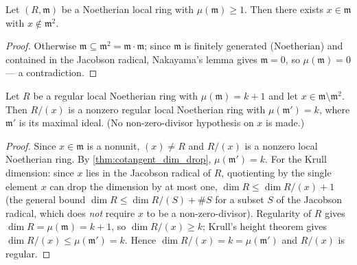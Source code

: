 \begin{lemma}
  \label{lem:notMemSq_witness}
  \leanok
  Let \((R, \mathfrak m)\) be a Noetherian local ring with \(\mu(\mathfrak m) \geq 1\).
  Then there exists \(x \in \mathfrak m\) with \(x \notin \mathfrak m^2\).
\end{lemma}
\begin{proof}
  \leanok
  Otherwise \(\mathfrak m \subseteq \mathfrak m^2 = \mathfrak m \cdot \mathfrak m\);
  since \(\mathfrak m\) is finitely generated (Noetherian) and contained in the
  Jacobson radical, Nakayama's lemma gives \(\mathfrak m = 0\), so
  \(\mu(\mathfrak m) = 0\) --- a contradiction.
\end{proof}

\begin{lemma}
  \label{lem:regular_quotient}
  \leanok
  Let \(R\) be a regular local Noetherian ring with \(\mu(\mathfrak m) = k + 1\) and let
  \(x \in \mathfrak m \setminus \mathfrak m^2\). Then \(R/(x)\) is a nonzero regular
  local Noetherian ring with \(\mu(\mathfrak m') = k\), where \(\mathfrak m'\) is its
  maximal ideal. (No non-zero-divisor hypothesis on \(x\) is made.)
\end{lemma}
\begin{proof}
  \leanok
  Since \(x \in \mathfrak m\) is a nonunit, \((x) \neq R\) and \(R/(x)\) is a nonzero
  local Noetherian ring. By \ref{thm:cotangent_dim_drop},
  \(\mu(\mathfrak m') = k\). For the Krull dimension: since \(x\) lies in the Jacobson
  radical of \(R\), quotienting by the single element \(x\) can drop the dimension by at
  most one, \(\dim R \leq \dim R/(x) + 1\) (the general bound
  \(\dim R \leq \dim R/(S) + \#S\) for a subset \(S\) of the Jacobson radical, which
  does \emph{not} require \(x\) to be a non-zero-divisor). Regularity of \(R\) gives
  \(\dim R = \mu(\mathfrak m) = k + 1\), so \(\dim R/(x) \geq k\); Krull's height
  theorem gives \(\dim R/(x) \leq \mu(\mathfrak m') = k\). Hence
  \(\dim R/(x) = k = \mu(\mathfrak m')\) and \(R/(x)\) is regular.
\end{proof}

